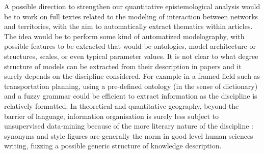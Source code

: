 A possible direction to strengthen our quantitative epistemological analysis would be to work on full textes related to the modeling of interaction between networks and territories, with the aim to automatically extract thematics within articles. The idea would be to perform some kind of automatized modelography, with possible features to be extracted that would be ontologies, model architecture or structures, scales, or even typical parameter values. It is not clear to what degree structure of models can be extracted from their description in papers and it surely depends on the discipline considered. For example in a framed field such as transportation planning, using a pre-defined ontology (in the sense of dictionary) and a fuzzy grammar could be efficient to extract information as the discipline is relatively formatted. In theoretical and quantitative geography, beyond the barrier of language, information organisation is surely less subject to unsupervised data-mining because of the more literary nature of the discipline : synonyms and style figures are generally the norm in good level human sciences writing, fuzzing a possible generic structure of knowledge description.









